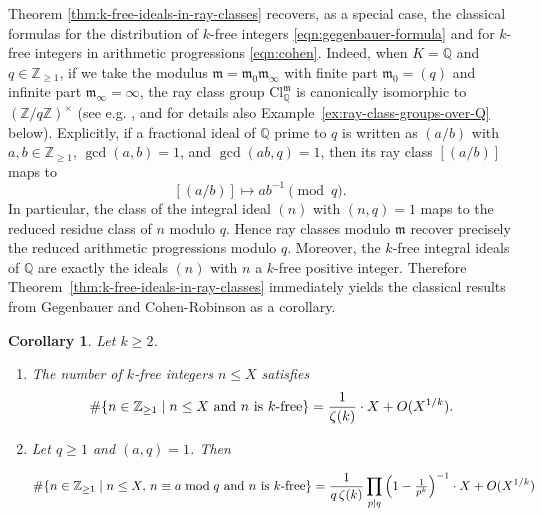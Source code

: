 \documentclass[11pt, reqno]{amsart}
\numberwithin{equation}{section}
\newtheorem{corollary}[theorem]{Corollary}
\newcommand{\suchthat}{\;\ifnum\currentgrouptype=16 \middle\fi|\;}
\newcommand{\Z}{\mathbb{Z}}
\newcommand{\Q}{\mathbb{Q}}
\theoremstyle{definition}
\begin{document}
Theorem \ref{thm:k-free-ideals-in-ray-classes} recovers, as a special case, the classical formulas for the distribution of $k$-free integers \eqref{eqn:gegenbauer-formula} and for $k$-free integers in arithmetic progressions \eqref{eqn:cohen}. Indeed, when $K=\mathbb{Q}$ and $q \in \Z_{\geq 1}$, if we take the modulus $\mathfrak{m} = \mathfrak{m}_0 \mathfrak{m}_{\infty}$ with finite part $\mathfrak{m}_0=(q)$ and infinite part  $\mathfrak{m}_{\infty} = \infty$,
the ray class group $\mathrm{Cl}_{\mathbb{Q}}^{\mathfrak{m}}$ is canonically isomorphic to $(\mathbb{Z}/q\mathbb{Z})^{\times}$ (see e.g. \cite[p. 127]{Lan94}, and for details also Example~\ref{ex:ray-class-groups-over-Q} below). Explicitly, if a fractional ideal of $\mathbb{Q}$ prime to $q$ is written as $(a/b)$ with $a, b \in \Z_{\geq 1}$, $\gcd(a, b) = 1$, and $\gcd(ab,q)=1$, then its ray class $[(a/b)]$ maps to
$$
[(a/b)]\longmapsto a b^{-1} \pmod q.
$$
In particular, the class of the integral ideal $(n)$ with $(n,q)=1$ maps to the reduced residue class of $n$ modulo $q$. Hence ray classes modulo $\mathfrak{m}$ recover precisely the reduced arithmetic progressions modulo $q$. Moreover, the $k$-free integral ideals of $\mathbb{Q}$ are exactly the ideals $(n)$ with $n$ a $k$-free positive integer. Therefore Theorem~\ref{thm:k-free-ideals-in-ray-classes} immediately yields the classical results from Gegenbauer and Cohen-Robinson as a corollary.

\begin{corollary}\label{cor:gegenbauer-cohen-robinson}
Let $k \ge 2$.
\begin{enumerate}
\item The number of $k$-free integers $n \le X$ satisfies
\[
\#\{  n \in \Z_{\ge 1} \suchthat \text{$n \le X$ and $n$ is $k$-free} \}
= \frac{1}{\zeta(k)} \cdot X + O(X^{1/k}).
\]

\item Let $q \ge 1$ and $(a,q)=1$. Then

\begin{equation*}
\#\{ n \in \Z_{\ge 1} \suchthat \text{$n \le X, \, n \equiv a \bmod q$ and $n$ is $k$-free} \}
= \frac{1}{q\,\zeta(k)}
  \prod_{p\mid q}\left(1 - \tfrac{1}{p^k}\right)^{-1}
  \cdot X
  + O(X^{1/k})
\end{equation*}
\end{enumerate}
\end{corollary}
\end{document}
